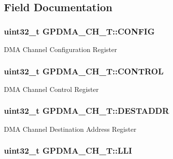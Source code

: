 \subsection{Field Documentation}
\hypertarget{structGPDMA__CH__T_a4f74d11c01d0d3203ceeebd9db2a50a8}{
\subsubsection[{C\-O\-N\-F\-I\-G}]{ uint32\-\_\-t G\-P\-D\-M\-A\-\_\-\-C\-H\-\_\-\-T\-::\-C\-O\-N\-F\-I\-G}}\label{structGPDMA__CH__T_a4f74d11c01d0d3203ceeebd9db2a50a8}
D\-M\-A Channel Configuration Register \hypertarget{structGPDMA__CH__T_a7b2997d55e2bbe71c2f99d5879ca75c3}{
\subsubsection[{C\-O\-N\-T\-R\-O\-L}]{ uint32\-\_\-t G\-P\-D\-M\-A\-\_\-\-C\-H\-\_\-\-T\-::\-C\-O\-N\-T\-R\-O\-L}}\label{structGPDMA__CH__T_a7b2997d55e2bbe71c2f99d5879ca75c3}
D\-M\-A Channel Control Register \hypertarget{structGPDMA__CH__T_ab61baba3fc08a7ba4b0502d043ed6ccd}{
\subsubsection[{D\-E\-S\-T\-A\-D\-D\-R}]{ uint32\-\_\-t G\-P\-D\-M\-A\-\_\-\-C\-H\-\_\-\-T\-::\-D\-E\-S\-T\-A\-D\-D\-R}}\label{structGPDMA__CH__T_ab61baba3fc08a7ba4b0502d043ed6ccd}
D\-M\-A Channel Destination Address Register \hypertarget{structGPDMA__CH__T_a240936dbac9f3a949572b3dd196bd83f}{
\subsubsection[{L\-L\-I}]{ uint32\-\_\-t G\-P\-D\-M\-A\-\_\-\-C\-H\-\_\-\-T\-::\-L\-L\-I}}\label{structGPDMA__CH__T_a240936dbac9f3a949572b3dd196bd83f}
